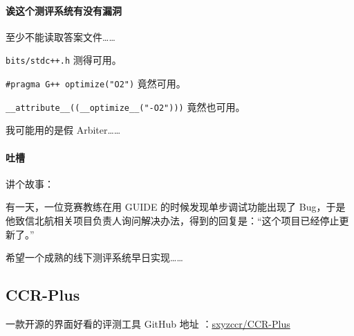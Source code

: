 \paragraph{诶这个测评系统有没有漏洞}

至少不能读取答案文件……

\texttt{bits/stdc++.h} 测得可用。

\texttt{\#pragma G++ optimize("O2")} 竟然可用。

\texttt{\_\_attribute\_\_((\_\_optimize\_\_("-O2")))} 竟然也可用。

我可能用的是假 Arbiter……

\paragraph{吐槽}

讲个故事：

有一天，一位竞赛教练在用 GUIDE 的时候发现单步调试功能出现了 Bug，于是他致信北航相关项目负责人询问解决办法，得到的回复是：“这个项目已经停止更新了。”

希望一个成熟的线下测评系统早日实现……

\subsection{CCR-Plus}

一款开源的界面好看的评测工具 GitHub 地址 ：\href{https://github.com/sxyzccr/CCR-Plus}{sxyzccr/CCR-Plus}
